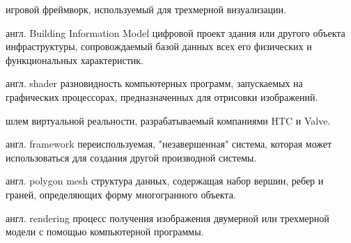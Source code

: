 ﻿

\begin{rglossary}
    {игровой фреймворк, используемый для трехмерной визуализации.%
    \cite{DocUnity}}

    {англ. Building Information Model}
    {цифровой проект здания или другого объекта инфраструктуры,
    сопровождаемый базой данных всех его физических и функциональных характеристик.%
    \cite{NationalBIMfaqs}}

    {англ. shader}
    {разновидность компьютерных программ, запускаемых на графических процессорах,
    предназначенных для отрисовки изображений.}

    {шлем виртуальной реальности, разрабатываемый компаниями HTC и Valve.}

    {англ. framework}
    {переиспользуемая, "незавершенная" система,
    которая может использоваться для создания другой производной системы.%
    \cite{Johnson1988,Schmidt2000}}

    {англ. polygon mesh}
    {структура данных, содержащая набор вершин, ребер и граней,
    определяющих форму многогранного объекта.}

    {англ. rendering}
    {процесс получения изображения двумерной или трехмерной модели
    с помощью компьютерной программы.}
\end{rglossary}